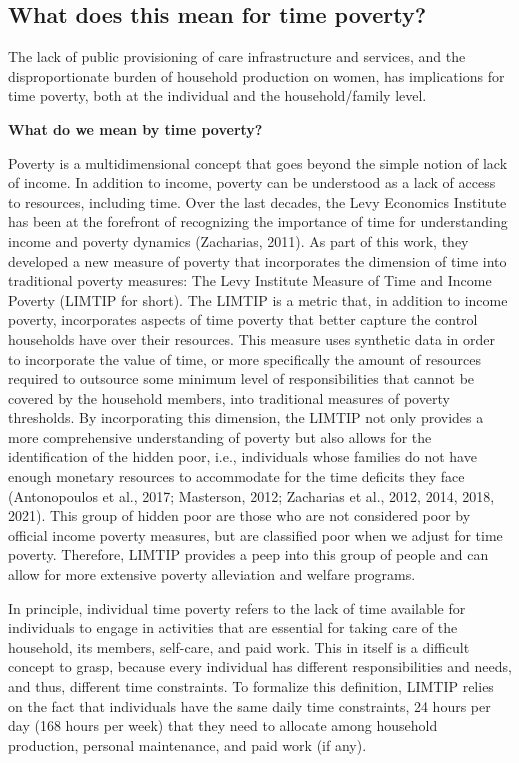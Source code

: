 \documentclass[
  11pt,
]{article}
\begin{document}
\subsection{What does this mean for time
poverty?}\label{what-does-this-mean-for-time-poverty}

The lack of public provisioning of care infrastructure and services, and
the disproportionate burden of household production on women, has
implications for time poverty, both at the individual and the
household/family level.

\textbf{What do we mean by time poverty?}

Poverty is a multidimensional concept that goes beyond the simple notion
of lack of income. In addition to income, poverty can be understood as a
lack of access to resources, including time. Over the last decades, the
Levy Economics Institute has been at the forefront of recognizing the
importance of time for understanding income and poverty dynamics
(Zacharias, 2011). As part of this work, they developed a new measure of
poverty that incorporates the dimension of time into traditional poverty
measures: The Levy Institute Measure of Time and Income Poverty (LIMTIP
for short). The LIMTIP is a metric that, in addition to income poverty,
incorporates aspects of time poverty that better capture the control
households have over their resources. This measure uses synthetic data
in order to incorporate the value of time, or more specifically the
amount of resources required to outsource some minimum level of
responsibilities that cannot be covered by the household members, into
traditional measures of poverty thresholds. By incorporating this
dimension, the LIMTIP not only provides a more comprehensive
understanding of poverty but also allows for the identification of the
hidden poor, i.e., individuals whose families do not have enough
monetary resources to accommodate for the time deficits they face
(Antonopoulos et al., 2017; Masterson, 2012; Zacharias et al., 2012,
2014, 2018, 2021). This group of hidden poor are those who are not
considered poor by official income poverty measures, but are classified
poor when we adjust for time poverty. Therefore, LIMTIP provides a peep
into this group of people and can allow for more extensive poverty
alleviation and welfare programs.

In principle, individual time poverty refers to the lack of time
available for individuals to engage in activities that are essential for
taking care of the household, its members, self-care, and paid work.
This in itself is a difficult concept to grasp, because every individual
has different responsibilities and needs, and thus, different time
constraints. To formalize this definition, LIMTIP relies on the fact
that individuals have the same daily time constraints, 24 hours per day
(168 hours per week) that they need to allocate among household
production, personal maintenance, and paid work (if any).
\end{document}
